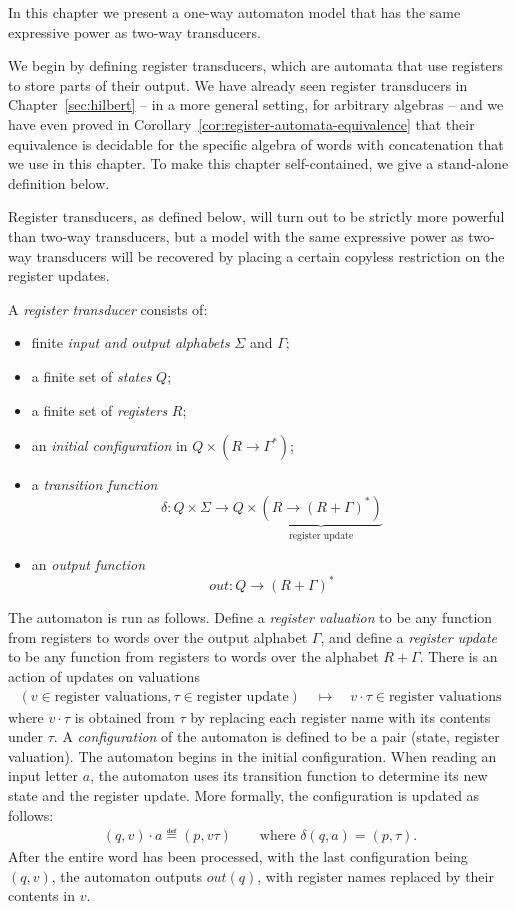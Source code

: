 In this chapter we present a one-way automaton model that has the same expressive power as two-way transducers. 

We begin  by defining {register transducers}, which are automata that use registers to store parts of their output. We have already seen register transducers in Chapter~\ref{sec:hilbert} -- in a more general setting, for arbitrary algebras --  and we have even proved in Corollary~\ref{cor:register-automata-equivalence} that their equivalence is decidable for the specific algebra of words with concatenation that we use in this chapter. To make this chapter self-contained, we give a stand-alone definition below. 

Register transducers, as defined below, will turn out to be strictly more powerful than two-way transducers, but a model with the same expressive power as two-way transducers will be recovered by placing a  certain {copyless restriction} on the register updates. 
\begin{definition}
	\label{def:sst}
	A \emph{register transducer} consists of:
	\begin{itemize}
		\item finite  \emph{input and output alphabets} $\Sigma$ and $\Gamma$;
\item a finite set of \emph{states} $Q$;
 \item  a finite set of \emph{registers} $R$;
\item an \emph{initial configuration} in $Q \times (R \to \Gamma^*)$;
\item  a \emph{transition function}
$$ \delta : Q \times \Sigma \to Q \times \underbrace{(R \to (R + \Gamma)^*)}_{\text{register update}}$$
\item  an \emph{output function}
$$ out : Q \to (R + \Gamma)^*$$
	\end{itemize}
\end{definition}

The automaton is run as follows.  Define a \emph{register valuation} to be any function from registers to words over the  output alphabet $\Gamma$,  and  define a  \emph{register update} to be any function from registers to words over the alphabet  $R + \Gamma$.
There is an action of updates on valuations 
\begin{align*}
(v \in \text{register valuations}, \tau \in \text{register update}) \quad \mapsto \quad v\cdot \tau \in \text{register valuations}	
\end{align*}
where $v \cdot\tau$ is obtained from $\tau$ by replacing each register name with its contents under $\tau$. A \emph{configuration} of the automaton  is defined to be  a pair (state, register valuation).  
The automaton begins in the initial configuration. When reading an input letter $a$, the automaton uses its transition function to determine its new state and the register update. More formally, the  configuration is updated as follows:
\begin{align*}
(q,v) \cdot a \eqdef  (p, v\tau) \qquad \text{where $\delta(q,a)=(p,\tau)$}	.
\end{align*}
After the entire word has been processed, with the last configuration being $(q,v)$,  the automaton outputs $out(q)$, with register names replaced by their contents in $v$.

